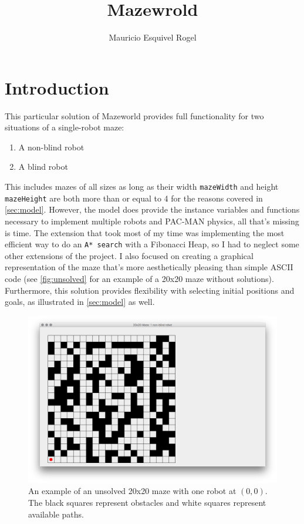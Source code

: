 \documentclass{article}
\title{Mazewrold}
\author{Mauricio Esquivel Rogel}
\begin{document}
\maketitle

\section{Introduction}
This particular solution of Mazeworld provides full functionality for two situations of a single-robot maze: 
\begin{enumerate}
  \item A non-blind robot
  \item A blind robot
\end{enumerate}
This includes mazes of all sizes as long as their width  \verb`mazeWidth` and height  \verb`mazeHeight` are both more than or equal to 4 for the reasons covered in \cref{sec:model}. However, the model does provide the instance variables and functions necessary to implement multiple robots and PAC-MAN physics, all that's missing is time. The extension that took most of my time was implementing the most efficient way to do an \verb`A* search` with a Fibonacci Heap, so I had to neglect some other extensions of the project. I also focused on creating a graphical representation of the maze that's more aesthetically pleasing than simple ASCII code (see \autoref{fig:unsolved} for an example of a 20x20 maze without solutions).  Furthermore, this solution provides flexibility with selecting initial positions and goals, as illustrated in \cref{sec:model} as well.

\begin{figure}[!htb]
\label{fig:unsolved}
\centering
\includegraphics[width=1\linewidth]{./figures/maze20x20.png}
\cprotect\caption{An example of an unsolved 20x20 maze with one robot at $(0, 0)$. The black squares represent obstacles and white squares represent available paths.}
\end{figure}
\end{document}
